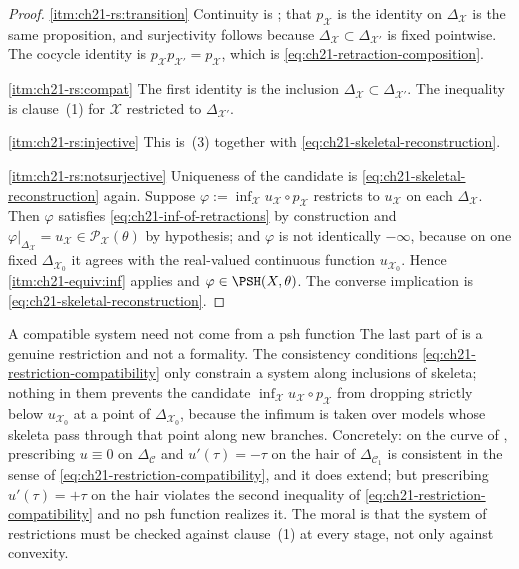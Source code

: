 \begin{proof}
\cref{itm:ch21-rs:transition}  Continuity is
; that $p_{\mathcal X}$ is the identity on
$\Delta_{\mathcal X}$ is the same proposition, and surjectivity follows
because $\Delta_{\mathcal X}\subset\Delta_{\mathcal X'}$ is fixed
pointwise.  The cocycle identity is
$p_{\mathcal X}p_{\mathcal X'}=p_{\mathcal X}$, which is
\eqref{eq:ch21-retraction-composition}.

\cref{itm:ch21-rs:compat}  The first identity is the inclusion
$\Delta_{\mathcal X}\subset\Delta_{\mathcal X'}$.  The inequality is
clause~(1) for $\mathcal X$ restricted to $\Delta_{\mathcal X'}$.

\cref{itm:ch21-rs:injective}  This is
\,(3) together with
\eqref{eq:ch21-skeletal-reconstruction}.

\cref{itm:ch21-rs:notsurjective}  Uniqueness of the candidate is
\eqref{eq:ch21-skeletal-reconstruction} again.  Suppose
$\varphi:=\inf_{\mathcal X}u_{\mathcal X}\circ p_{\mathcal X}$ restricts
to $u_{\mathcal X}$ on each $\Delta_{\mathcal X}$.  Then $\varphi$
satisfies \eqref{eq:ch21-inf-of-retractions} by construction and
$\varphi|_{\Delta_{\mathcal X}}=u_{\mathcal X}\in
\mathcal P_{\mathcal X}(\theta)$ by hypothesis; and $\varphi$ is not
identically $-\infty$, because on one fixed $\Delta_{\mathcal X_0}$ it
agrees with the real-valued continuous function $u_{\mathcal X_0}$.
Hence \,\cref{itm:ch21-equiv:inf} applies and
$\varphi\in\PSH(X,\theta)$.  The converse implication is
\eqref{eq:ch21-skeletal-reconstruction}.
\end{proof}

\begin{warning}{A compatible system need not come from a psh function}
The last part of  is a genuine
restriction and not a formality.  The consistency conditions
\eqref{eq:ch21-restriction-compatibility} only constrain a system along
inclusions of skeleta; nothing in them prevents the candidate
$\inf_{\mathcal X}u_{\mathcal X}\circ p_{\mathcal X}$ from dropping
strictly below $u_{\mathcal X_0}$ at a point of
$\Delta_{\mathcal X_0}$, because the infimum is taken over models whose
skeleta pass through that point along new branches.  Concretely: on the
curve of , prescribing $u\equiv0$ on
$\Delta_{\mathcal C}$ and $u'(\tau)=-\tau$ on the hair of
$\Delta_{\mathcal C_1}$ is consistent in the sense of
\eqref{eq:ch21-restriction-compatibility}, and it does extend; but
prescribing $u'(\tau)=+\tau$ on the hair violates the second inequality of
\eqref{eq:ch21-restriction-compatibility} and no psh function realizes it.
The moral is that the system of restrictions must be checked against
clause~(1) at every stage, not only against convexity.
\end{warning}

